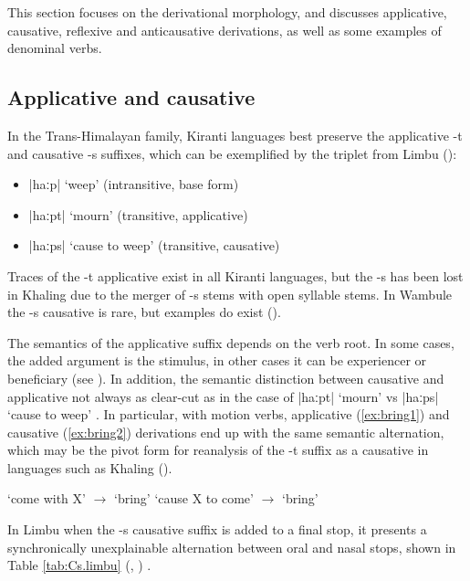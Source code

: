 \documentclass[oneside,a4paper,11pt]{article}
\newcommand{\ipa}[1]{{\phon\mbox{#1}}} %
\newcommand{\dhatu}[2]{|\ipa{#1}| `#2'}
\begin{document}
This section focuses on the derivational morphology, and discusses applicative, causative, reflexive and anticausative derivations,  as well as some examples of denominal verbs.

\subsection{Applicative and causative} \label{sec:appl}
In the Trans-Himalayan family, Kiranti languages best preserve the applicative \ipa{-t} and causative \ipa{-s} suffixes, which can be exemplified by the triplet from Limbu (\citealt{michailovsky85dental}):

\begin{itemize}
\item  \dhatu{haːp}{weep} (intransitive, base form)
\item  \dhatu{haːpt}{mourn} (transitive, applicative)
\item  \dhatu{haːps}{cause to weep} (transitive, causative)
\end{itemize}

Traces of the \ipa{-t} applicative exist in all Kiranti languages, but the \ipa{-s} has been lost in Khaling due to the merger of \ipa{-s} stems with open syllable stems.  In Wambule the -s causative is rare, but examples do exist (\citealt[270-1]{opgenort04wambule}).

The semantics of the applicative suffix depends on the verb root. In some cases, the added argument is the stimulus, in other cases it can be experiencer or beneficiary (see \citealt{jacques15derivational.khaling}). In addition, the semantic distinction between causative and applicative not always as clear-cut as in the case of \dhatu{haːpt}{mourn} vs \dhatu{haːps}{cause to weep} . In particular, with motion verbs, applicative (\ref{ex:bring1}) and causative (\ref{ex:bring2}) derivations end up with the same semantic alternation, which may be the pivot form for reanalysis of the \ipa{-t} suffix as a causative in languages such as Khaling (\citealt{jacques15derivational.khaling}).
\begin{exe}
\ex \label{ex:bring1}
\glt `come with X' $\rightarrow$ `bring'
\ex \label{ex:bring2}
\glt `cause X to come' $\rightarrow$ `bring'
\end{exe}
 
In Limbu when the \ipa{-s} causative suffix is added to a final stop, it presents a synchronically unexplainable alternation between oral and nasal stops, shown in Table \ref{tab:Cs.limbu} (\citealt{driem87}, \citealt[xiii]{michailovsky02dico}) .
\end{document}
